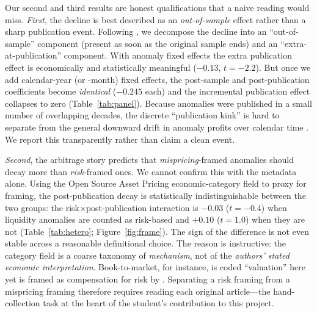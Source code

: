 \documentclass[12pt]{article}
\begin{document}
Our second and third results are honest qualifications that a naive reading would miss.
\emph{First}, the decline is best described as an \emph{out-of-sample} effect rather than a
sharp publication event. Following \citet{mcleanpontiff2016}, we decompose the decline into an
``out-of-sample'' component (present as soon as the original sample ends) and an
``extra-at-publication'' component. With anomaly fixed effects the extra publication effect is
economically and statistically meaningful ($-0.13$, $t=-2.2$). But once we add calendar-year
(or -month) fixed effects, the post-sample and post-publication coefficients become
\emph{identical} ($-0.245$ each) and the incremental publication effect collapses to zero
(Table~\ref{tab:panel}). Because anomalies were published in a small number of overlapping
decades, the discrete ``publication kink'' is hard to separate from the general downward drift
in anomaly profits over calendar time \citep{chordia2014,mcleanpontiff2016}. We report this
transparently rather than claim a clean event.

\emph{Second}, the arbitrage story predicts that \emph{mispricing}-framed anomalies should
decay more than \emph{risk}-framed ones. We cannot confirm this with the metadata alone. Using
the Open Source Asset Pricing economic-category field to proxy for framing, the
post-publication decay is statistically indistinguishable between the two groups: the
risk$\times$post-publication interaction is $-0.03$ ($t=-0.4$) when liquidity anomalies are
counted as risk-based and $+0.10$ ($t=1.0$) when they are not (Table~\ref{tab:hetero};
Figure~\ref{fig:frame}). The sign of the difference is not even stable across a reasonable
definitional choice. The reason is instructive: the category field is a coarse taxonomy of
\emph{mechanism}, not of the \emph{authors' stated economic interpretation}. Book-to-market,
for instance, is coded ``valuation'' here yet is framed as compensation for risk by
\citet{famafrench1996}. Separating a risk framing from a mispricing framing therefore requires
reading each original article---the hand-collection task at the heart of the student's
contribution to this project.
\end{document}
